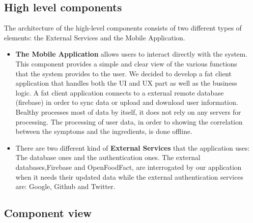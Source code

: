 \documentclass [12pt]{article}
\begin{document}
\subsection{High level components}
The architecture of the high-level components consists of two different types of elements:
the External Services and the Mobile Application.
\begin{itemize}
\item \textbf{The Mobile Application} allows users to interact directly with the system. This component provides a simple and clear view of the various functions that the system provides to the user. We decided to develop a fat client application that handles both the UI and UX part as well as the business logic. A fat client application  connects to a external remote database (firebase) in order to sync data or upload and download user information. 
Bealthy processes most of data by itself, it does not rely on any servers for processing. 
The processing of user data, in order to showing the correlation between the symptoms and the ingredients, is done offline.
\item There are two different kind of \textbf{External Services} that the application uses: The database ones and the authentication ones.
The external databases,Firebase and OpenFoodFact, are interrogated by our application when it needs their updated data while the external authentication services are: Google, Github and Twitter.
\end{itemize}

\subsection{Component view}
\end{document}
